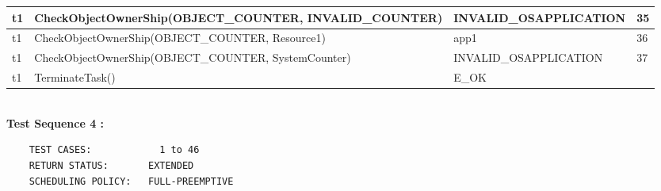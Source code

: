 \documentclass[10pt]{article}
\newlength{\Li}\settowidth{\Li}{Running}
\newlength{\Lii}\setlength{\Lii}{7cm}
\newlength{\Liiii}\setlength{\Liiii}{0.9cm}
\newlength{\Liii}\setlength{\Liii}{\textwidth} \addtolength{\Liii}{-\Li} \addtolength{\Liii}{-\Lii} \addtolength{\Liii}{-\Liiii}
\begin{document}
\begin{supertabular}{|p{\Li}|p{\Lii}|p{\Liii}|p{\Liiii}|}
	t1		& CheckObjectOwnerShip(OBJECT\_COUNTER, INVALID\_COUNTER)				& INVALID\_OSAPPLICATION			& 35 \\ \hline
	t1		& CheckObjectOwnerShip(OBJECT\_COUNTER, Resource1)						& app1							& 36 \\ \hline
	t1		& CheckObjectOwnerShip(OBJECT\_COUNTER, SystemCounter)					& INVALID\_OSAPPLICATION			& 37 \\ \hline	
	t1		& TerminateTask()														& E\_OK							& \\ \hline
	\end{supertabular}\\


	\textbf{Test Sequence 4 :}
	\begin{lstlisting}
	TEST CASES:		       1 to 46
	RETURN STATUS:	  	 EXTENDED
	SCHEDULING POLICY:   FULL-PREEMPTIVE
	\end{lstlisting}
	
	
\end{document}
